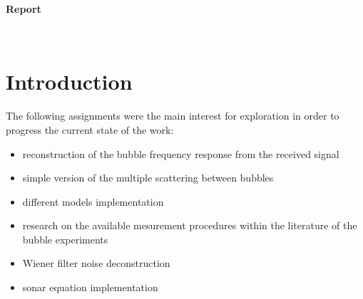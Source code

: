 \documentclass[11pt]{article}
\begin{document}
\thispagestyle{empty}

\begin{center}
{\large{}}   


\vspace*{4cm}
{\Large\textbf{Report \\ }}   


\vspace*{7cm}
 {\Large{}} \\\vspace*{0.1cm}

\vspace*{2.3cm}
\vspace*{0.2cm}
{\large{}}   
\end{center}

\newpage

\tableofcontents

\section{Introduction}

The following assignments were the main interest for exploration in order to progress the current state of the work:

\begin{itemize}
    \item reconstruction of the bubble frequency response from the received signal
    \item simple version of the multiple scattering between bubbles
    \item different models implementation
    \item research on the available mesurement procedures within the literature of the bubble experiments
    \item Wiener filter noise deconstruction
    \item sonar equation implementation
\end{itemize}
\end{document}
